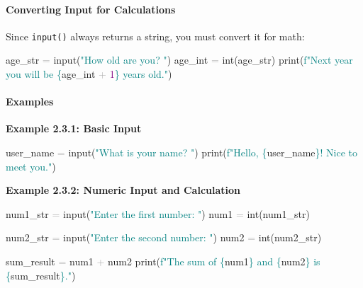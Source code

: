 \documentclass[
  justified,
  openright,
]{tufte-book}
\let\subsubsection\paragraph
\let\paragraph\paragraph
\newcommand{\BuiltInTok}[1]{#1}
\newcommand{\DecValTok}[1]{\textcolor{Purple}{#1}}
\newcommand{\NormalTok}[1]{#1}
\newcommand{\OperatorTok}[1]{\textcolor{DarkGray}{#1}}
\newcommand{\SpecialCharTok}[1]{\textcolor{Teal}{#1}}
\newcommand{\SpecialStringTok}[1]{\textcolor{Teal}{#1}}
\newcommand{\StringTok}[1]{\textcolor{Teal}{#1}}
\newenvironment{Shaded}{%
  \begin{snugshade}
}{%
  \end{snugshade}
}
\let\subsubsection\paragraph
\let\paragraph\paragraph
\begin{document}
\subsubsection{Converting Input for
Calculations}\label{converting-input-for-calculations}

Since \texttt{input()} always returns a string, you must convert it for
math:

\begin{Shaded}
\begin{Highlighting}[]
\NormalTok{age\_str }\OperatorTok{=} \BuiltInTok{input}\NormalTok{(}\StringTok{"How old are you? "}\NormalTok{)}
\NormalTok{age\_int }\OperatorTok{=} \BuiltInTok{int}\NormalTok{(age\_str)}
\BuiltInTok{print}\NormalTok{(}\SpecialStringTok{f"Next year you will be }\SpecialCharTok{\{}\NormalTok{age\_int }\OperatorTok{+} \DecValTok{1}\SpecialCharTok{\}}\SpecialStringTok{ years old."}\NormalTok{)}
\end{Highlighting}
\end{Shaded}

\subsubsection{Examples}\label{examples-3}

\textbf{Example 2.3.1: Basic Input}

\begin{Shaded}
\begin{Highlighting}[]
\NormalTok{user\_name }\OperatorTok{=} \BuiltInTok{input}\NormalTok{(}\StringTok{"What is your name? "}\NormalTok{)}
\BuiltInTok{print}\NormalTok{(}\SpecialStringTok{f"Hello, }\SpecialCharTok{\{}\NormalTok{user\_name}\SpecialCharTok{\}}\SpecialStringTok{! Nice to meet you."}\NormalTok{)}
\end{Highlighting}
\end{Shaded}

\textbf{Example 2.3.2: Numeric Input and Calculation}

\begin{Shaded}
\begin{Highlighting}[]
\NormalTok{num1\_str }\OperatorTok{=} \BuiltInTok{input}\NormalTok{(}\StringTok{"Enter the first number: "}\NormalTok{)}
\NormalTok{num1 }\OperatorTok{=} \BuiltInTok{int}\NormalTok{(num1\_str)}

\NormalTok{num2\_str }\OperatorTok{=} \BuiltInTok{input}\NormalTok{(}\StringTok{"Enter the second number: "}\NormalTok{)}
\NormalTok{num2 }\OperatorTok{=} \BuiltInTok{int}\NormalTok{(num2\_str)}

\NormalTok{sum\_result }\OperatorTok{=}\NormalTok{ num1 }\OperatorTok{+}\NormalTok{ num2}
\BuiltInTok{print}\NormalTok{(}\SpecialStringTok{f"The sum of }\SpecialCharTok{\{}\NormalTok{num1}\SpecialCharTok{\}}\SpecialStringTok{ and }\SpecialCharTok{\{}\NormalTok{num2}\SpecialCharTok{\}}\SpecialStringTok{ is }\SpecialCharTok{\{}\NormalTok{sum\_result}\SpecialCharTok{\}}\SpecialStringTok{."}\NormalTok{)}
\end{Highlighting}
\end{Shaded}
\end{document}
